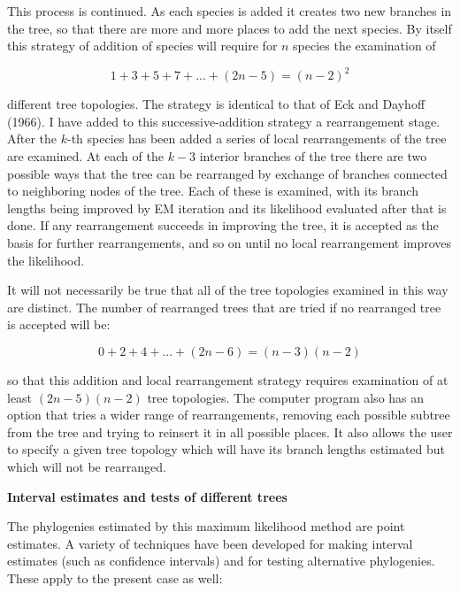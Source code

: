 This process is continued.  As each species is added it creates two new
branches in the tree, so that there are more and more places to add the next
species.  By itself this strategy of addition of species will require for
$n$ species the examination of

\begin{equation} %
     1 + 3 + 5 + 7 + ... + (2n-5)  =  (n-2)^2
\end{equation}

different tree topologies.  The strategy is identical to that of
Eck and Dayhoff (1966).  I have added to this successive-addition strategy
a rearrangement stage.  After the $k$-th species has been added a series of
local rearrangements of the tree are examined.  At each of the $k-3$ interior
branches of the tree there are two possible ways that the tree can be
rearranged by exchange of branches connected to neighboring nodes of the tree.
Each of these is examined, with its branch lengths being improved by EM
iteration and its likelihood evaluated after that is done.  If any
rearrangement succeeds in improving the tree, it is accepted as the basis for
further rearrangements, and so on until no local rearrangement improves the
likelihood.

It will not necessarily be true that all of the tree topologies examined in
this way are distinct.  The number of rearranged trees that are tried if no
rearranged tree is accepted will be:

\begin{equation} %
0 + 2 + 4 + ... + (2n-6)  =  (n-3)(n-2)
\end{equation}

so that this addition and local rearrangement strategy requires examination
of at least $(2n-5)(n-2)$ tree topologies.  The computer program also has
an option that tries a wider range of rearrangements, removing each possible
subtree from the tree and trying to reinsert it in all possible places.  It
also allows the user to specify a given tree topology which will have its
branch lengths estimated but which will not be rearranged.
\bigskip

\centerline{\bf Interval estimates and tests of different trees}
\nopagebreak

The phylogenies estimated by this maximum likelihood method are point
estimates.  A variety of techniques have been developed for making interval
estimates (such as confidence intervals) and for testing alternative
phylogenies.  These apply to the present case as well:

